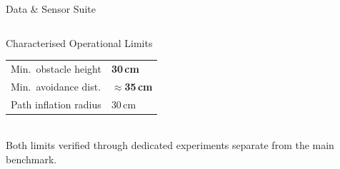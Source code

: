 \documentclass[aspectratio=169, 10pt]{beamer}
\begin{document}
\begin{frame}{Data \& Sensor Suite}
\begin{columns}[T]
  \vspace{5pt}
  \begin{alertblock}{Characterised Operational Limits}
    \small\renewcommand{\arraystretch}{1.1}
    \begin{tabular}{@{}ll@{}}
      Min.\ obstacle height & \textbf{30\,cm} \\
      Min.\ avoidance dist. & \textbf{$\approx$35\,cm} \\
      Path inflation radius & 30\,cm \\
    \end{tabular}
    \vspace{2pt}\\
    \footnotesize Both limits verified through dedicated
    experiments separate from the main benchmark.
  \end{alertblock}

\end{columns}
\end{frame}
\end{document}
